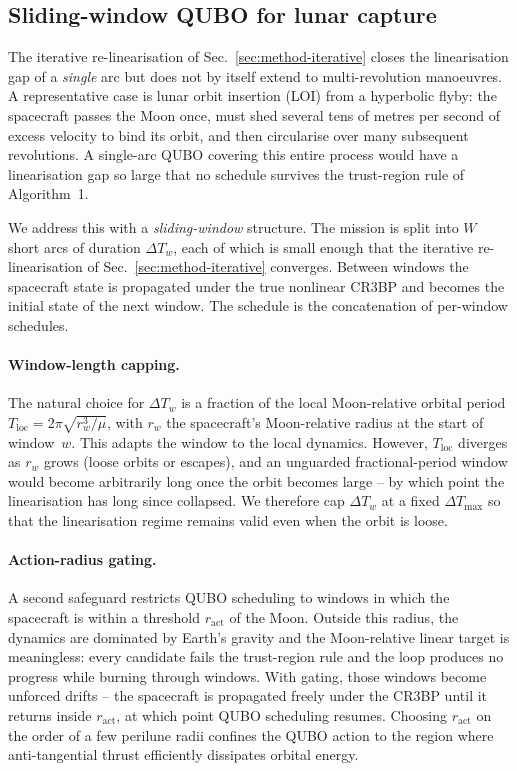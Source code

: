 \documentclass[11pt,a4paper]{article}
\theoremstyle{plain}
\begin{document}
\subsection{Sliding-window QUBO for lunar
  capture}\label{sec:method-sliding}

The iterative re-linearisation of
Sec.~\ref{sec:method-iterative} closes the linearisation gap of a
\emph{single} arc but does not by itself extend to multi-revolution
manoeuvres. A representative case is lunar orbit insertion (LOI)
from a hyperbolic flyby: the spacecraft passes the Moon once, must
shed several tens of metres per second of excess velocity to bind
its orbit, and then circularise over many subsequent revolutions.
A single-arc QUBO covering this entire process would have a
linearisation gap so large that no schedule survives the
trust-region rule of Algorithm~1.

We address this with a \emph{sliding-window} structure. The mission
is split into $W$ short arcs of duration $\Delta T_w$, each of
which is small enough that the iterative re-linearisation of
Sec.~\ref{sec:method-iterative} converges. Between windows the
spacecraft state is propagated under the true nonlinear CR3BP and
becomes the initial state of the next window. The schedule is the
concatenation of per-window schedules.

\paragraph{Window-length capping.} The natural choice for
$\Delta T_w$ is a fraction of the local Moon-relative orbital
period
$T_{\mathrm{loc}} = 2\pi\sqrt{r_w^3/\mu}$, with $r_w$ the
spacecraft's Moon-relative radius at the start of window~$w$. This
adapts the window to the local dynamics. However, $T_{\mathrm{loc}}$
diverges as $r_w$ grows (loose orbits or escapes), and an
unguarded fractional-period window would become arbitrarily long
once the orbit becomes large -- by which point the linearisation
has long since collapsed. We therefore cap $\Delta T_w$ at a
fixed $\Delta T_\mathrm{max}$ so that the linearisation regime
remains valid even when the orbit is loose.

\paragraph{Action-radius gating.} A second safeguard restricts
QUBO scheduling to windows in which the spacecraft is within a
threshold $r_\mathrm{act}$ of the Moon. Outside this radius, the
dynamics are dominated by Earth's gravity and the Moon-relative
linear target is meaningless: every candidate fails the
trust-region rule and the loop produces no progress while burning
through windows. With gating, those windows become unforced
drifts -- the spacecraft is propagated freely under the CR3BP
until it returns inside $r_\mathrm{act}$, at which point QUBO
scheduling resumes. Choosing $r_\mathrm{act}$ on the order of a
few perilune radii confines the QUBO action to the region where
anti-tangential thrust efficiently dissipates orbital energy.
\end{document}
